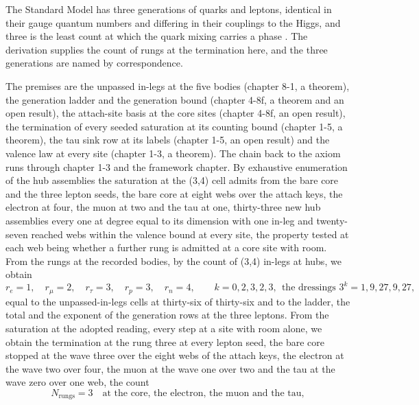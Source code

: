 \begin{chbridge}
The Standard Model has three generations of quarks and leptons, identical in their gauge quantum numbers and differing in their couplings to the Higgs, and three is the least count at which the quark mixing carries a phase \cite{Kobayashi1973,Weinberg1995}. The derivation supplies the count of rungs at the termination here, and the three generations are named by correspondence.
\end{chbridge}
\begin{chproof}
The premises are the unpassed in-legs at the five bodies (chapter 8-1, a theorem), the generation ladder and the generation bound (chapter 4-8f, a theorem and an open result), the attach-site basis at the core sites (chapter 4-8f, an open result), the termination of every seeded saturation at its counting bound (chapter 1-5, a theorem), the tau sink row at its labels (chapter 1-5, an open result) and the valence law at every site (chapter 1-3, a theorem). The chain back to the axiom runs through chapter 1-3 and the framework chapter. By exhaustive enumeration of the hub assemblies the saturation at the (3,4) cell admits from the bare core and the three lepton seeds, the bare core at eight webs over the attach keys, the electron at four, the muon at two and the tau at one, thirty-three new hub assemblies every one at degree equal to its dimension with one in-leg and twenty-seven reached webs within the valence bound at every site, the property tested at each web being whether a further rung is admitted at a core site with room. From the rungs at the recorded bodies, by the count of (3,4) in-legs at hubs, we obtain
\begin{equation}
r_{e} = 1 , \quad r_{\mu} = 2 , \quad r_{\tau} = 3 , \quad r_{p} = 3 , \quad r_{n} = 4 , \qquad k = 0, 2, 3, 2, 3 ,\ \ \text{the dressings } 3^{k} = 1, 9, 27, 9, 27 ,
\end{equation}
equal to the unpassed-in-legs cells at thirty-six of thirty-six and to the ladder, the total and the exponent of the generation rows at the three leptons. From the saturation at the adopted reading, every step at a site with room alone, we obtain the termination at the rung three at every lepton seed, the bare core stopped at the wave three over the eight webs of the attach keys, the electron at the wave two over four, the muon at the wave one over two and the tau at the wave zero over one web, the count
\begin{equation}
N_{\text{rungs}} = 3 \quad \text{at the core, the electron, the muon and the tau} ,

\end{equation}
\end{chproof}
